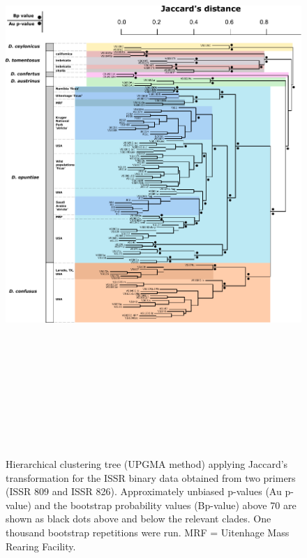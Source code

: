 \begin{figure}[H]
	\centering
	\includegraphics[height = 22cm, width = 18cm, scale =0.7]{Images/upgma_tree.pdf}
	\caption{Hierarchical clustering tree (UPGMA method) applying Jaccard's transformation for the ISSR binary data obtained from two primers (ISSR 809 and ISSR 826). Approximately unbiased p-values (Au p-value) and the bootstrap probability values (Bp-value) above 70 are shown as black dots above and below the relevant clades. One thousand bootstrap repetitions were run. MRF = Uitenhage Mass Rearing Facility.}
	\label{fig:issr_upgmaTree}
\end{figure}

